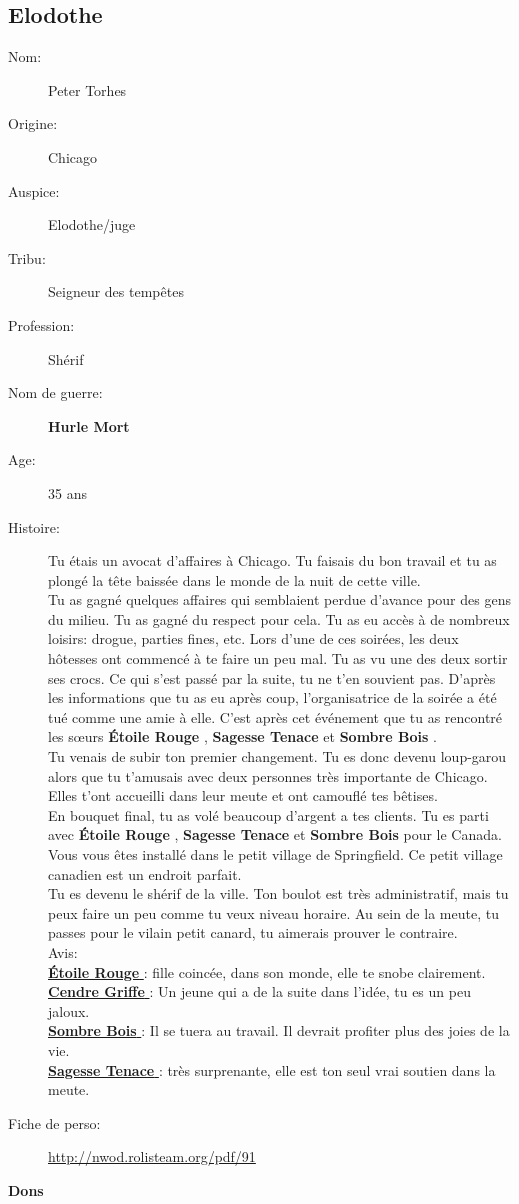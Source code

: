 \documentclass[oneside,12pt]{book}
\newcommand{\Lynn}{\textbf{Étoile Rouge} }
\newcommand{\Jessica}{\textbf{Sagesse Tenace} }
\newcommand{\Luke}{\textbf{Cendre Griffe} }
\newcommand{\Peter}{\textbf{Hurle Mort} }
\newcommand{\Leonard}{\textbf{Sombre Bois} }
\begin{document}
\begin{flushleft}
\section{Elodothe}
\begin{description}
\item[Nom:]{Peter Torhes}
\item[Origine:]{Chicago}
\item[Auspice:]{Elodothe/juge}
\item[Tribu:]{Seigneur des tempêtes}
\item[Profession:]{Shérif}
\item[Nom de guerre:]{\Peter}
\item[Age:]{35 ans}
\item[Histoire:]{
Tu étais un avocat d'affaires à Chicago. 
Tu faisais du bon travail et tu as plongé la tête baissée dans le monde de la nuit de cette ville.\\
Tu as gagné quelques affaires qui semblaient perdue d'avance pour des gens du milieu.
Tu as gagné du respect pour cela. Tu as eu accès à de nombreux loisirs: drogue, parties fines, etc. Lors d'une de ces soirées, les deux hôtesses ont commencé à te faire un peu mal. Tu as vu une des deux sortir ses crocs. Ce qui s'est passé par la suite, tu ne t'en souvient pas.  
D'après les informations que tu as eu après coup, l'organisatrice de la soirée a été tué comme une amie à elle. 
C'est après cet événement que tu as rencontré les sœurs \Lynn , \Jessica et \Leonard.\\
Tu venais de subir ton premier changement. Tu es donc devenu loup-garou alors que tu t'amusais avec deux personnes très importante de Chicago.
Elles t'ont accueilli dans leur meute et ont camouflé tes bêtises. \\
En bouquet final, tu as volé beaucoup d'argent a tes clients. 
Tu es parti avec \Lynn, \Jessica et \Leonard pour le Canada. Vous vous êtes installé dans le petit village de Springfield. Ce petit village canadien est un endroit parfait. \\
Tu es devenu le shérif de la ville. Ton boulot est très administratif, mais tu peux faire un peu comme tu veux niveau horaire. 
Au sein de la meute, tu passes pour le vilain petit canard, tu aimerais prouver le contraire. \\

Avis:\\
\underline{\Lynn} : fille coincée, dans son monde, elle te snobe clairement.\\
\underline{\Luke} : Un jeune qui a de la suite dans l'idée, tu es un peu jaloux.\\
\underline{\Leonard} : Il se tuera au travail. Il devrait profiter plus des joies de la vie.\\
\underline{\Jessica} : très surprenante, elle est ton seul vrai soutien dans la meute. \\
}
\item[Fiche de perso:]{\href{http://nwod.rolisteam.org/pdf/91}{http://nwod.rolisteam.org/pdf/91}}
\end{description}
\clearpage
\textbf{\large Dons} 
\vspace{0.5cm}


\end{flushleft}
\end{document}
